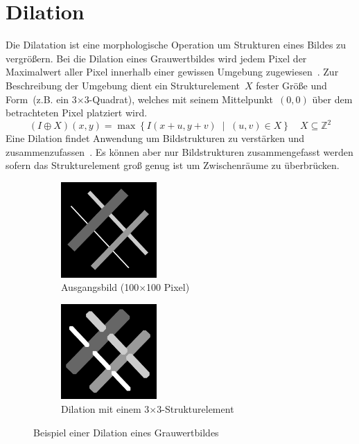 \section{Dilation}
\writtenby{\dcauthornameewie}%
Die Dilatation ist eine morphologische Operation um Strukturen eines Bildes zu vergrößern.
Bei die Dilation eines Grauwertbildes wird jedem Pixel der Maximalwert aller Pixel innerhalb einer gewissen Umgebung zugewiesen~\cite[Kapitel~3.5]{steinmueller2008}.
Zur Beschreibung der Umgebung dient ein Strukturelement~$X$ fester Größe und Form~(z.B. ein 3$\times$3-Quadrat), welches mit seinem Mittelpunkt~$(0,0)$ über dem betrachteten Pixel platziert wird.
\begin{equation}
  (I\oplus X)(x,y)= \max \left\{ I(x+u,y+v) \;\middle|\; (u,v) \in X \right\} \quad X \subseteq \mathbb{Z}^2
\end{equation}
Eine Dilation findet Anwendung um Bildstrukturen zu verstärken und zusammenzufassen~\cite[Kapitel~3.1]{steinmueller2008}.
Es können aber nur Bildstrukturen zusammengefasst werden sofern das Strukturelement groß genug ist um Zwischenräume zu überbrücken.

\begin{figure}[H]
  \label{fig:dilation}
  \centering
  \begin{subfigure}[t]{.49\linewidth}
    \centering
    \includegraphics[width=0.4\textwidth]{img/basics/dilation/before}
    \caption{Ausgangsbild (100$\times$100 Pixel)}
  \end{subfigure}
  \begin{subfigure}[t]{.49\linewidth}
    \centering
    \includegraphics[width=0.4\textwidth]{img/basics/dilation/after}
    \caption{Dilation mit einem 3$\times$3-Strukturelement}
  \end{subfigure}
  \caption{Beispiel einer Dilation eines Grauwertbildes}
\end{figure}

